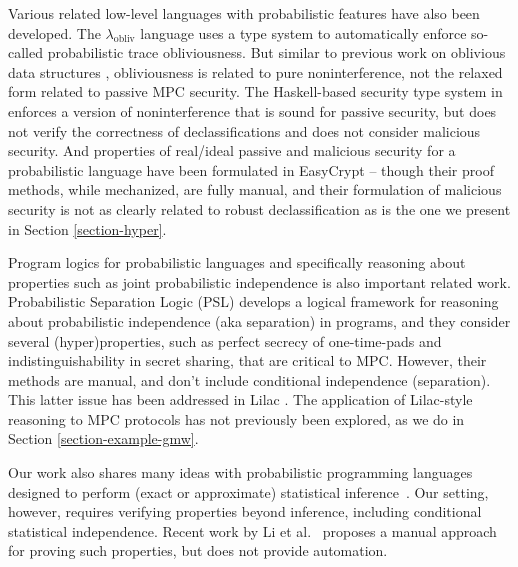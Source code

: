 Various related low-level languages with probabilistic features have
also been developed. The $\lambda_{\mathrm{obliv}}$ language
\cite{darais2019language} uses a type system to automatically
enforce so-called probabilistic trace obliviousness.  But similar to
previous work on oblivious data structures \cite{10.1145/3498713},
obliviousness is related to pure noninterference, not the relaxed form
related to passive MPC security. The Haskell-based security type
system in \cite{6266151} enforces a version of noninterference that is
sound for passive security, but does not verify the correctness of
declassifications and does not consider malicious security. And
properties of real/ideal passive and malicious security for a
probabilistic language have been formulated in EasyCrypt
\cite{8429300}-- though their proof methods, while mechanized, are
fully manual, and their formulation of malicious security is not as
clearly related to robust declassification as is the one we present in
Section \ref{section-hyper}.

Program logics for probabilistic languages and specifically reasoning
about properties such as joint probabilistic independence is also
important related work. Probabilistic Separation Logic (PSL)
\cite{barthe2019probabilistic} develops a logical framework for
reasoning about probabilistic independence (aka separation) in
programs, and they consider several (hyper)properties, such as perfect
secrecy of one-time-pads and indistinguishability in secret sharing,
that are critical to MPC. However, their methods are manual, and
don't include conditional independence (separation). This
latter issue has been addressed in Lilac \cite{li2023lilac}. The
application of Lilac-style reasoning to MPC protocols has not
previously been explored, as we do in Section
\ref{section-example-gmw}.

Our work also shares many ideas with probabilistic programming
languages designed to perform (exact or approximate) statistical
inference~\cite{holtzen2020scaling, carpenter2017stan, wood2014new,
  bingham2019pyro, albarghouthi2017fairsquare, de2007problog,
  pfeffer2009figaro, saad2021sppl}. Our setting, however, requires
verifying properties beyond inference, including conditional
statistical independence. Recent work by Li et al.~\cite{li2023lilac} proposes a
manual approach for proving such properties, but does not provide
automation.

